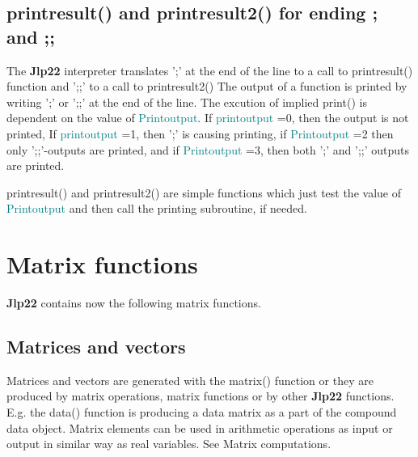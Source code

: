 \subsection{\textcolor{VioletRed}{printresult}() and \textcolor{VioletRed}{printresult2}() for ending ; and ;;}
\label{printresult}
The \textbf{Jlp22} interpreter translates ';'  at the end of the
line to a call to \textcolor{VioletRed}{printresult}() function and ';;' to a call to \textcolor{VioletRed}{printresult2}()
The output of a function is printed by writing ';' or ';;' at the end of the line. The excution of implied \textcolor{VioletRed}{print}()
is dependent on the value of \textcolor{teal}{Printoutput}. If \textcolor{teal}{printoutput} =0,
then the output is not printed, If \textcolor{teal}{printoutput} =1, then ';' is
causing printing, if \textcolor{teal}{Printoutput} =2 then only ';;'-outputs are
printed, and if \textcolor{teal}{Printoutput} =3, then both ';' and ';;' outputs are printed.
\begin{note}
\textcolor{VioletRed}{printresult}() and \textcolor{VioletRed}{printresult2}() are  simple functions
which just test the value of
\textcolor{teal}{Printoutput} and then call the  printing subroutine, if needed.
\end{note}
\section{Matrix functions}
\label{matrixs}
\textbf{Jlp22} contains now the following matrix functions.
\subsection{Matrices and vectors}
\label{matrixo}
Matrices and vectors are generated with the \textcolor{VioletRed}{matrix}() function or they are
produced by matrix operations, matrix functions or by other \textbf{Jlp22} functions. E.g.
the \textcolor{VioletRed}{data}() function is producing a data matrix as a part of the compound data
object. Matrix elements can be used in arithmetic operations as input or output
in similar way as real variables.
See Matrix computations.
